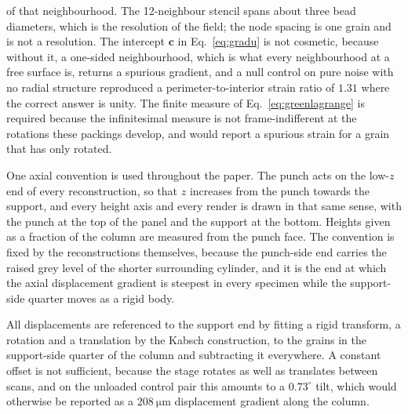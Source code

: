 \documentclass[preprint,12pt,numbers]{elsarticle}
\begin{document}
  of that neighbourhood.  The 12-neighbour stencil spans about three bead
  diameters, which is the resolution of the field; the node spacing is one
  grain and is not a resolution.
  The intercept $\mathbf{c}$ in Eq.~\eqref{eq:gradu} is not cosmetic, because without
  it, a one-sided neighbourhood, which is what every neighbourhood at a free
  surface is, returns a spurious gradient, and a null control on pure noise with
  no radial structure reproduced a perimeter-to-interior strain ratio of $1.31$
  where the correct answer is unity.  The finite measure of
  Eq.~\eqref{eq:greenlagrange} is required because the infinitesimal measure is
  not frame-indifferent at the rotations these packings develop, and would
  report a spurious strain for a grain that has only rotated.

  One axial convention is used throughout the paper.  The punch acts on the
  low-$z$ end of every reconstruction, so that $z$ increases from the punch
  towards the support, and every height axis and every render is drawn in that
  same sense, with the punch at the top of the panel and the support at the
  bottom.  Heights given as a fraction of the column are measured from the
  punch face.  The convention is fixed by the reconstructions themselves,
  because the punch-side end carries the raised grey level of the shorter
  surrounding cylinder, and it is the end at which the axial displacement
  gradient is steepest in every specimen while the support-side quarter moves
  as a rigid body.

  All displacements are referenced to the support end by fitting a rigid
  transform, a rotation and a translation by the Kabsch construction, to the
  grains in the support-side quarter of the column and subtracting it
  everywhere.  A constant offset is not sufficient, because the stage rotates as well as
  translates between scans, and on the unloaded control pair this amounts to a
  $0.73^\circ$ tilt, which would otherwise be reported as a
  $\SI{208}{\micro\meter}$ displacement gradient along the column.
\end{document}
